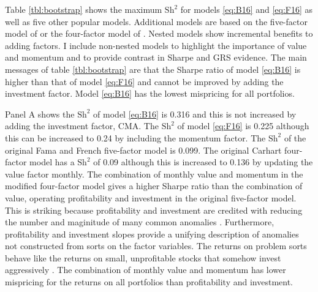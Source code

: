 

Table \ref{tbl:bootstrap} shows the maximum $\text{Sh}^2$ for models
\ref{eq:B16} and \ref{eq:F16} as well as five other popular models.
Additional models are based on the five-factor model of \textcite{fama2015five}
or the four-factor model of \textcite{carhart1997persistence}.
Nested models show incremental benefits to adding factors.
I include non-nested models to highlight the importance of value and momentum
and to provide contrast in Sharpe and GRS evidence.
The main messages of table \ref{tbl:bootstrap} are that the Sharpe ratio of
model \ref{eq:B16} is higher than that of model \ref{eq:F16} and
cannot be improved by adding the investment factor.
Model \ref{eq:B16} has the lowest mispricing for all portfolios.

Panel A shows the $\text{Sh}^2$ of model \ref{eq:B16} is 0.316 and this
is not increased by adding the investment factor, CMA.
The $\text{Sh}^2$ of model \ref{eq:F16} is 0.225 although this can be
increased to 0.24 by including the momentum factor.
The $\text{Sh}^2$ of the original Fama and French five-factor model is 0.099.
The original Carhart four-factor model has a $\text{Sh}^2$ of 0.09 although
this is increased to 0.136 by updating the value factor monthly.
The combination of monthly value and momentum in the modified four-factor
model gives a higher Sharpe ratio than the combination of value, operating
profitability and investment in the original five-factor model.
This is striking because profitability and investment are credited with
reducing the number and maginitude of many common anomalies
\parencite{fama2015five}.
Furthermore, profitability and investment slopes provide a unifying description
of anomalies not constructed from sorts on the factor variables.
The returns on problem sorts behave like the returns on small,
unprofitable stocks that somehow invest aggressively
\parencite{fama2016dissecting}.
The combination of monthly value and momentum has lower mispricing for
the returns on all portfolios than profitability and investment.

